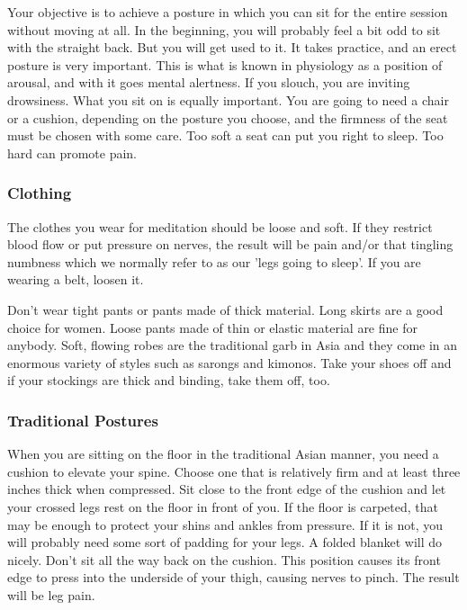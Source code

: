 Your objective is to achieve a posture in which you can sit for the entire
session without moving at all. In the beginning, you will probably feel a bit
odd to sit with the straight back. But you will get used to it. It takes
practice, and an erect posture is very important. This is what is known in
physiology as a position of arousal, and with it goes mental alertness. If you
slouch, you are inviting drowsiness. What you sit on is equally important. You
are going to need a chair or a cushion, depending on the posture you choose, and
the firmness of the seat must be chosen with some care. Too soft a seat can put
you right to sleep. Too hard can promote pain.

\subsubsection*{Clothing}
 The clothes you wear for meditation should be loose and soft. If they
restrict blood flow or put pressure on nerves, the result will be pain and/or
that tingling numbness which we normally refer to as our 'legs going to sleep'.
If you are wearing a belt, loosen it.

Don't wear tight pants or pants made of thick material. Long skirts are a good
choice for women. Loose pants made of thin or elastic material are fine for
anybody. Soft, flowing robes are the traditional garb in Asia and they come in
an enormous variety of styles such as sarongs and kimonos. Take your shoes off
and if your stockings are thick and binding, take them off, too.

\subsubsection*{Traditional Postures}
When you are sitting on the floor in the traditional Asian manner, you need a cushion to elevate your spine. Choose one that is
relatively firm and at least three inches thick when compressed. Sit close to the front edge of the cushion and let your crossed legs
rest on the floor in front of you. If the floor is carpeted, that may be enough to protect your shins and ankles from pressure. If it is
not, you will probably need some sort of padding for your legs. A folded blanket will do nicely. Don't sit all the way back on the
cushion. This position causes its front edge to press into the underside of your thigh, causing nerves to pinch. The result will be
leg pain.

